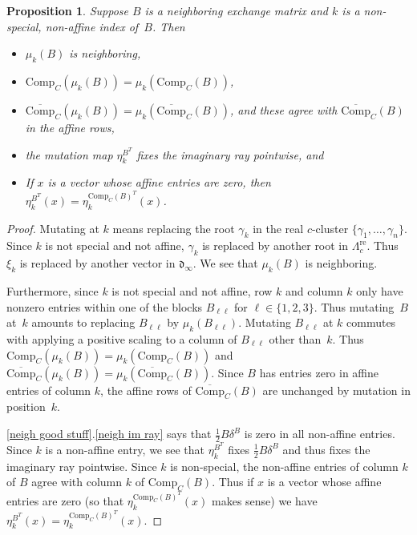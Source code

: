 \documentclass{amsart}
\newtheorem{proposition}{Proposition}[section]
\theoremstyle{definition}
\theoremstyle{remark}
\numberwithin{equation}{section}
\newcommand{\set}[1]{{\lbrace #1 \rbrace}}
\newcommand{\0}{{\mathbf{0}}}
\newcommand{\Comp}{\mathrm{Comp}_C}
\newcommand{\CompPlus}{\overline{\mathrm{Comp}}_C}
\newcommand{\re}{\mathrm{re}}
\renewcommand{\d}{{\mathfrak d}}
\newcommand{\APTChar}{\Lambda}
\newcommand{\APT}[1]{\APTChar_{#1}}
\newcommand{\APTre}[1]{\APT{#1}^\re}
\begin{document}
\begin{proposition}\label{nonspecial mut}
Suppose $B$ is a neighboring exchange matrix and $k$ is a non-special, non-affine index of~$B$.
Then 
\begin{itemize}
\item
$\mu_k(B)$ is neighboring,
\item
$\Comp(\mu_k(B))=\mu_k(\Comp(B))$,
\item
$\CompPlus(\mu_k(B))=\mu_k(\CompPlus(B))$, and these agree with $\CompPlus(B)$ in the affine rows,
\item
the mutation map $\eta^{B^T}_k$ fixes the imaginary ray pointwise, and 
\item
If $x$ is a vector whose affine entries are zero, then $\eta^{B^T}_k(x)=\eta^{\Comp(B)^T}_k(x)$.
\end{itemize}
\end{proposition}
\begin{proof}
Mutating at $k$ means replacing the root $\gamma_k$ in the real $c$-cluster $\set{\gamma_1,\ldots,\gamma_n}$.
Since $k$ is not special and not affine, $\gamma_k$ is replaced by another root in $\APTre{c}$.
Thus $\xi_k$ is replaced by another vector in $\d_\infty$.
We see that $\mu_k(B)$ is neighboring.

Furthermore, since $k$ is not special and not affine, row $k$ and column $k$ only have nonzero entries within one of the blocks $B_{\ell\ell}$ for $\ell\in\set{1,2,3}$.
Thus mutating~$B$ at~$k$ amounts to replacing $B_{\ell\ell}$ by $\mu_k(B_{\ell\ell})$.
Mutating $B_{\ell\ell}$ at $k$ commutes with applying a positive scaling to a column of $B_{\ell\ell}$ other than~$k$.
Thus $\Comp(\mu_k(B))=\mu_k(\Comp(B))$ and ${\CompPlus(\mu_k(B))=\mu_k(\CompPlus(B))}$.
Since $B$ has entries zero in affine entries of column $k$, the affine rows of $\CompPlus(B)$ are unchanged by mutation in position~$k$.

\cref{neigh good stuff}.\ref{neigh im ray} says that $\frac12B\delta^B$ is zero in all non-affine entries.
Since $k$ is a non-affine entry, we see that $\eta^{B^T}_k$ fixes $\frac12B\delta^B$ and thus fixes the imaginary ray pointwise.
Since $k$ is non-special, the non-affine entries of column $k$ of $B$ agree with column $k$ of $\Comp(B)$.
Thus if $x$ is a vector whose affine entries are zero (so that $\eta^{\Comp(B)^T}_k(x)$ makes sense) we have $\eta^{B^T}_k(x)=\eta^{\Comp(B)^T}_k(x)$.
\end{proof}
\end{document}
